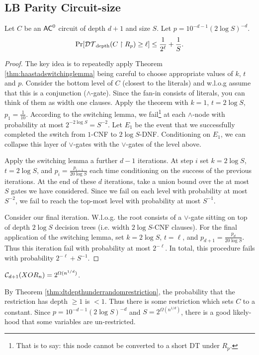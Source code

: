 \documentclass[11pt]{article}
\begin{document}
	\subsection{LB Parity Circuit-size}
	\begin{theorem}
		\label{thm:dtdepthunderrandomrestriction}
		Let $C$ be an $\mathsf{AC}^0$ circuit of depth $d + 1$ and size $S$. Let $p = 10^{-d - 1}(2\log S)^{-d}$.
		\[\Pr[\mathcal{DT}_{\mathrm{depth}}(C \upharpoonright R_p) \geq \ell] \leq \frac{1}{2^\ell} + \frac{1}{S}.\] 
	\end{theorem}
	\begin{proof}
		The key idea is to repeatedly apply Theorem \ref{thm:haastadswitchinglemma} being careful to choose appropriate values of $k$, $t$ and $p$. Consider the bottom level of $C$ (closest to the literals) and w.l.o.g assume that this is a conjunction ($\land$-gate). Since the fan-in consists of literals, you can think of them as width one clauses. Apply the theorem with $k = 1$, $t = 2\log S$, $p_1 = \frac{1}{10}$. According to the switching lemma, we fail\footnote{That is to say: this node cannot be converted to a short DT under $R_p$.} at each $\land$-node with probability at most $2^{-2\log S} = S^{-2}$. Let $E_1$ be the event that we successfully completed the switch from $1$-CNF to $2\log S$-DNF. Conditioning on $E_1$, we can collapse this layer of $\lor$-gates with the $\lor$-gates of the level above. 
		
		Apply the switching lemma a further $d-1$ iterations. At step $i$ set $k = 2\log S$, $t = 2\log S$, and $p_{i} = \frac{p_{i-1}}{20\log S}$ each time conditioning on the success of the previous iterations. At the end of these $d$ iterations, take a union bound over the at most $S$ gates we have considered. Since we fail on each level with probability at most $S^{-2}$, we fail to reach the top-most level with probability at most $S^{-1}$. 
		
		Consider our final iteration. W.l.o.g. the root consists of a $\lor$-gate sitting on top of depth $2\log S$ decision trees (i.e. width $2\log S$-CNF clauses). For the final application of the switching lemma, set $k = 2\log S$, $t = \ell$, and $p_{d+1} = \frac{p_d}{20\log S}$. Thus this iteration fail with probability at most $2^{-\ell}$. In total, this procedure fails with probability $2^{-\ell} + S^{-1}$.
	\end{proof}
	
	\begin{corollary}
		$\mathcal{C}_{d+1}(XOR_n) = 2^{\Omega(n^{1/d})}$.
	\end{corollary}
	By Theorem \ref{thm:dtdepthunderrandomrestriction}, the probability that the restriction has depth $\geq 1$ is $< 1$. Thus there is some restriction which sets $C$ to a constant. Since $p = 10^{-d-1}(2\log S)^{-d}$ and $S = 2^{\Omega(n^{1/d})}$, there is a good likely-hood that some variables are un-restricted.
	
\end{document}
